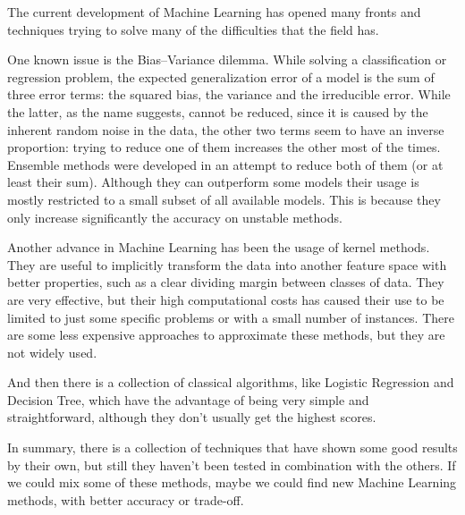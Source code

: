 \begin{pre-delivery}
  The current development of Machine Learning has opened many fronts and
  techniques trying to solve many of the difficulties that the field has.

  One known issue is the Bias--Variance dilemma\cite{domingos2000unified}. While solving a classification
  or regression problem, the expected generalization error of a model is the
  sum of three error terms: the squared bias, the variance and the irreducible error.
  While the latter, as the name suggests, cannot be reduced, since it is
  caused by the inherent random noise in the data, the other two terms seem
  to have an inverse proportion: trying to reduce one of them increases the
  other most of the times.
  Ensemble methods\cite{polikar2006ensemble} were developed in an attempt to reduce both of them (or at
  least their sum).
  Although they can outperform some models
  their usage is mostly restricted to a small subset of all available models.
  This is because they only increase significantly the accuracy on unstable
  methods.

  Another advance in Machine Learning has been the usage of kernel methods\cite{Cortes1995}. They
  are useful to implicitly transform the data into another feature space with better properties,
  such as a clear dividing margin between classes of data. They are very
  effective, but their high computational costs has caused their use to be limited to just
  some specific problems or with a small number of instances. There are some
  less expensive approaches to approximate these methods, but they are not
  widely used\cite{rahimi2008random}\cite{NIPS2000_1866}.

  And then there is a collection of classical algorithms, like Logistic
  Regression and Decision Tree, which have the
  advantage of being very simple and straightforward, although they don't
  usually get the highest scores.

  In summary, there is a collection of techniques that have shown some good results by their
  own, but still they haven't been tested in combination with the others. If we
  could mix some of these methods, maybe we could find new Machine Learning
  methods, with better accuracy or trade-off.


\end{pre-delivery}

